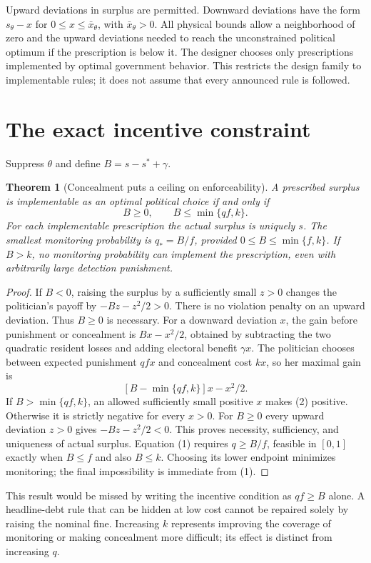\documentclass[11pt]{article}
\newtheorem{theorem}{Theorem}
\theoremstyle{remark}
\begin{document}
Upward deviations in surplus are permitted. Downward deviations have the
form $s_\theta-x$ for $0\leq x\leq\bar x_\theta$, with
$\bar x_\theta>0$. All physical bounds allow a neighborhood of zero
and the upward deviations needed to reach the unconstrained political
optimum if the prescription is below it. The designer chooses only
prescriptions implemented by optimal government behavior. This restricts
the design family to implementable rules; it does not assume that every
announced rule is followed.

\section{The exact incentive constraint}
Suppress $\theta$ and define $B=s-s^*+\gamma$.
\begin{theorem}[Concealment puts a ceiling on enforceability]
A prescribed surplus is implementable as an optimal political choice if
and only if
\[
 B\geq0,\qquad B\leq\min\{qf,k\}. \tag{1}
\]
For each implementable prescription the actual surplus is uniquely $s$.
The smallest monitoring probability is $q_*=B/f$, provided
$0\leq B\leq\min\{f,k\}$. If $B>k$, no monitoring probability can
implement the prescription, even with arbitrarily large detection punishment.
\end{theorem}
\begin{proof}
If $B<0$, raising the surplus by a sufficiently small $z>0$ changes the
politician's payoff by $-Bz-z^2/2>0$. There is no violation penalty on
an upward deviation. Thus $B\geq0$ is necessary.
For a downward deviation $x$, the gain before punishment or concealment
is $Bx-x^2/2$, obtained by subtracting the two quadratic resident losses
and adding electoral benefit $\gamma x$. The politician chooses between
expected punishment $qfx$ and concealment cost $kx$, so her maximal gain
is
\[
 [B-\min\{qf,k\}]x-x^2/2. \tag{2}
\]
If $B>\min\{qf,k\}$, an allowed sufficiently small positive $x$
makes (2) positive. Otherwise it is strictly negative for every $x>0$.
For $B\geq0$ every upward deviation $z>0$ gives
$-Bz-z^2/2<0$. This proves necessity, sufficiency, and uniqueness of
actual surplus. Equation (1) requires $q\geq B/f$, feasible in $[0,1]$
exactly when $B\leq f$ and also $B\leq k$. Choosing its lower endpoint
minimizes monitoring; the final impossibility is immediate from (1).
\end{proof}
This result would be missed by writing the incentive condition as
$qf\geq B$ alone. A headline-debt rule that can be hidden at low cost
cannot be repaired solely by raising the nominal fine. Increasing $k$
represents improving the coverage of monitoring or making concealment
more difficult; its effect is distinct from increasing $q$.
\end{document}
